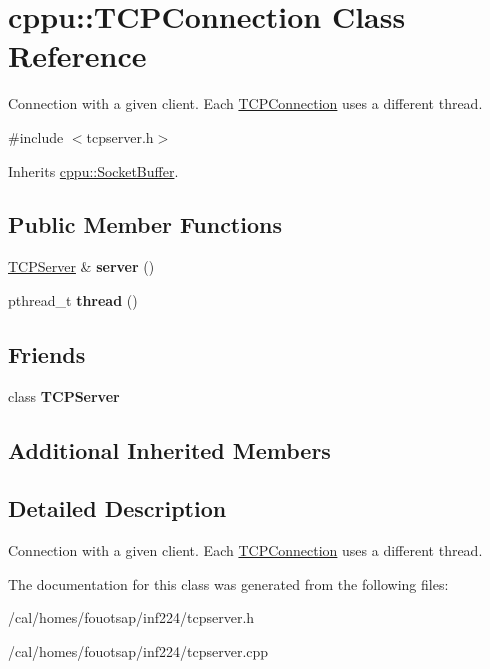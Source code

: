 \hypertarget{classcppu_1_1_t_c_p_connection}{\section{cppu\+:\+:T\+C\+P\+Connection Class Reference}
\label{classcppu_1_1_t_c_p_connection}
}


Connection with a given client. Each \hyperlink{classcppu_1_1_t_c_p_connection}{T\+C\+P\+Connection} uses a different thread.  




{\ttfamily \#include $<$tcpserver.\+h$>$}



Inherits \hyperlink{classcppu_1_1_socket_buffer}{cppu\+::\+Socket\+Buffer}.

\subsection*{Public Member Functions}
\begin{DoxyCompactItemize}
\item 
\hypertarget{classcppu_1_1_t_c_p_connection_a4186946c7c22e3c2cebe3a97aa78f5f7}{\hyperlink{classcppu_1_1_t_c_p_server}{T\+C\+P\+Server} \& {\bfseries server} ()}\label{classcppu_1_1_t_c_p_connection_a4186946c7c22e3c2cebe3a97aa78f5f7}

\item 
\hypertarget{classcppu_1_1_t_c_p_connection_a4663875b80fced790502880c72e6e672}{pthread\+\_\+t {\bfseries thread} ()}\label{classcppu_1_1_t_c_p_connection_a4663875b80fced790502880c72e6e672}

\end{DoxyCompactItemize}
\subsection*{Friends}
\begin{DoxyCompactItemize}
\item 
\hypertarget{classcppu_1_1_t_c_p_connection_ae4cfdb1814d91a8d28dadb49adda68f0}{class {\bfseries T\+C\+P\+Server}}\label{classcppu_1_1_t_c_p_connection_ae4cfdb1814d91a8d28dadb49adda68f0}

\end{DoxyCompactItemize}
\subsection*{Additional Inherited Members}


\subsection{Detailed Description}
Connection with a given client. Each \hyperlink{classcppu_1_1_t_c_p_connection}{T\+C\+P\+Connection} uses a different thread. 

The documentation for this class was generated from the following files\+:\begin{DoxyCompactItemize}
\item 
/cal/homes/fouotsap/inf224/tcpserver.\+h\item 
/cal/homes/fouotsap/inf224/tcpserver.\+cpp\end{DoxyCompactItemize}

